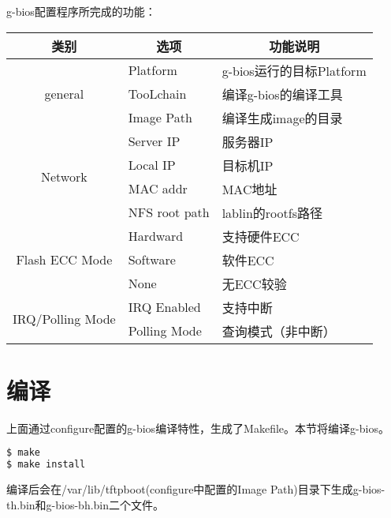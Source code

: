 g-bios配置程序所完成的功能：
\begin{table}[htbp]
\centering
\setlength{\parindent}{0pt}
\begin{tabular}{|c|l|l|}
\hline
类别 & \multicolumn{1}{|c|}{选项} & \multicolumn{1}{|c|}{功能说明} \\ \hline
\multirow{3}{*}{general} & Platform & g-bios运行的目标Platform \\ \cline{2-3}
		& TooLchain & 编译g-bios的编译工具 \\ \cline{2-3}
		& Image Path & 编译生成image的目录 \\ \hline
\multirow{4}{*}{Network} & Server IP & 服务器IP \\ \cline{2-3}
		& Local IP & 目标机IP \\ \cline{2-3}
		& MAC addr & MAC地址\\ \cline{2-3}
		& NFS root path &  lablin的rootfs路径\\ \hline
\multirow{3}{*}{Flash ECC Mode}   & Hardward & 支持硬件ECC\\ \cline{2-3}
		& Software & 软件ECC\\ \cline{2-3}
		& None & 无ECC较验\\ \cline{2-3}
\multirow{2}{*}{IRQ/Polling Mode} & IRQ Enabled & 支持中断 \\ \cline{2-3}
		& Polling Mode & 查询模式（非中断）\\ \hline
\end{tabular}
\end{table}


\section{编译}
上面通过configure配置的g-bios编译特性，生成了Makefile。本节将编译g-bios。
\begin{lstlisting}[language=bash,numbers=none]
$ make
$ make install
\end{lstlisting}
编译后会在/var/lib/tftpboot(configure中配置的Image Path)目录下生成g-bios-th.bin和g-bios-bh.bin二个文件。
